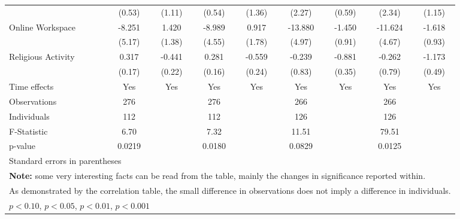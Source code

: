 \begin{table}[htbp]
\begin{tabular}{l*{8}{c}}
                              &(0.53)         &(1.11)         &(0.54)         &(1.36)         &(2.27)         &(0.59)         &(2.34)         &(1.15)         \\
\hspace{0.25cm} Online Workspace&-8.251         &1.420         &-8.989\sym{^+} &0.917         &-13.880\sym{*}  &-1.450         &-11.624\sym{*}  &-1.618\sym{^+} \\
                              &(5.17)         &(1.38)         &(4.55)         &(1.78)         &(4.97)         &(0.91)         &(4.67)         &(0.93)         \\
\hspace{0.25cm} Religious Activity&0.317\sym{^+} &-0.441\sym{^+} &0.281\sym{^+} &-0.559\sym{*}  &-0.239         &-0.881\sym{*}  &-0.262         &-1.173\sym{*}  \\
                              &(0.17)         &(0.22)         &(0.16)         &(0.24)         &(0.83)         &(0.35)         &(0.79)         &(0.49)         \\
Time effects                  &  Yes         &  Yes         &  Yes         &  Yes         &  Yes         &  Yes         &  Yes         &  Yes         \\
\midrule
Observations                  &  276         &              &  276         &              &  266         &              &  266         &              \\
Individuals                   &  112         &              &  112         &              &  126         &              &  126         &              \\
F-Statistic                   & 6.70         &              & 7.32         &              &11.51         &              &79.51         &              \\
p-value                       &0.0219         &              &0.0180         &              &0.0829         &              &0.0125         &              \\
\bottomrule
\multicolumn{9}{l}{\footnotesize Standard errors in parentheses}\\
\multicolumn{9}{l}{\footnotesize \textbf{Note:} some very interesting facts can be read from the table, mainly the changes in significance reported within.}\\
\multicolumn{9}{l}{\footnotesize As demonstrated by the correlation table, the small difference in observations does not imply a difference in individuals.}\\
\multicolumn{9}{l}{\footnotesize \sym{^+} \(p<0.10\), \sym{*} \(p<0.05\), \sym{**} \(p<0.01\), \sym{***} \(p<0.001\)}\\
\end{tabular}
\end{table}
